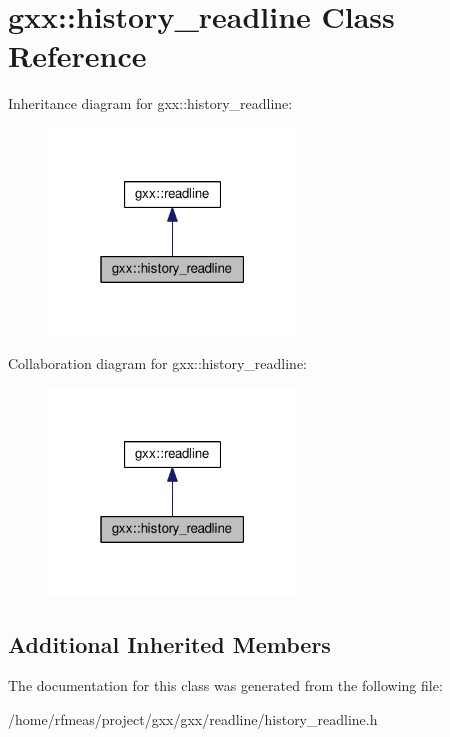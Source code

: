\hypertarget{classgxx_1_1history__readline}{}\section{gxx\+:\+:history\+\_\+readline Class Reference}
\label{classgxx_1_1history__readline}


Inheritance diagram for gxx\+:\+:history\+\_\+readline\+:
\nopagebreak
\begin{figure}[H]
\begin{center}
\leavevmode
\includegraphics[width=187pt]{classgxx_1_1history__readline__inherit__graph}
\end{center}
\end{figure}


Collaboration diagram for gxx\+:\+:history\+\_\+readline\+:
\nopagebreak
\begin{figure}[H]
\begin{center}
\leavevmode
\includegraphics[width=187pt]{classgxx_1_1history__readline__coll__graph}
\end{center}
\end{figure}
\subsection*{Additional Inherited Members}


The documentation for this class was generated from the following file\+:\begin{DoxyCompactItemize}
\item 
/home/rfmeas/project/gxx/gxx/readline/history\+\_\+readline.\+h\end{DoxyCompactItemize}
